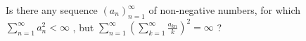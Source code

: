 Is there any sequence $(a_n)_{n=1}^{\infty}$ of non-negative numbers, for which $\sum_{n=1}^{\infty} a_n^2<\infty$ , but $\sum_{n=1}^{\infty}\left(\sum_{k=1}^{\infty}\frac{a_{kn}}{k}   \right)^2=\infty$ ?


